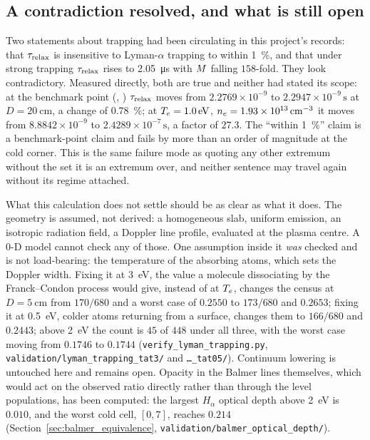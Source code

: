 \subsection{A contradiction resolved, and what is still open}

Two statements about trapping had been circulating in this project's records:
that $\tau_{\mathrm{relax}}$ is insensitive to Lyman-$\alpha$ trapping to within
\SI{1}{\percent}, and that under strong trapping $\tau_{\mathrm{relax}}$ rises to
\SI{2.05}{\micro\second} with $M$ falling $158$-fold. They look
contradictory. Measured directly, both are true and neither had stated its
scope: at the benchmark point (\benchTe, \benchne) $\tau_{\mathrm{relax}}$ moves from
$2.2769\times10^{-9}$ to $2.2947\times10^{-9}\,\si{\second}$ at
$D = \SI{20}{\centi\metre}$, a change of \SI{0.78}{\percent}; at
$T_e = \SI{1.0}{\electronvolt}$,
$n_e = 1.93\times10^{13}\,\si{\per\cubic\centi\metre}$ it moves from
$8.8842\times10^{-9}$ to $2.4289\times10^{-7}\,\si{\second}$, a factor of $27.3$.
The ``within \SI{1}{\percent}'' claim is a benchmark-point claim and fails by
more than an order of magnitude at the cold corner. This is the same failure
mode as quoting any other extremum without the set it is an extremum over, and
neither sentence may travel again without its regime attached.

What this calculation does not settle should be as clear as what it does. The
geometry is assumed, not derived: a homogeneous slab, uniform emission, an
isotropic radiation field, a Doppler line profile, evaluated at the plasma
centre. A $0$-D model cannot check any of those. One assumption inside it
\emph{was} checked and is not load-bearing: the temperature of the absorbing
atoms, which sets the Doppler width. Fixing it at \SI{3}{\electronvolt}, the
value a molecule dissociating by the Franck--Condon process would give, instead
of at $T_e$, changes the census at $D = \SI{5}{\centi\metre}$ from $170/680$ and
a worst case of $0.2550$ to $173/680$ and $0.2653$; fixing it at
\SI{0.5}{\electronvolt}, colder atoms returning from a surface, changes them to
$166/680$ and $0.2443$; above \SI{2}{\electronvolt} the count is $45$ of $448$
under all three, with the worst case moving from $0.1746$ to $0.1744$
(\texttt{verify\_lyman\_trapping.py}, \texttt{validation/lyman\_trapping\_tat3/}
and \texttt{\ldots\_tat05/}). Continuum lowering is
untouched here and remains open. Opacity in the Balmer lines themselves, which
would act on the observed ratio directly rather than through the level
populations, has been computed: the largest $H_\alpha$ optical depth above
\SI{2}{\electronvolt} is $0.010$, and the worst cold cell, $[0,7]$, reaches
$0.214$ (Section~\ref{sec:balmer_equivalence},
\texttt{validation/balmer\_optical\_depth/}).

